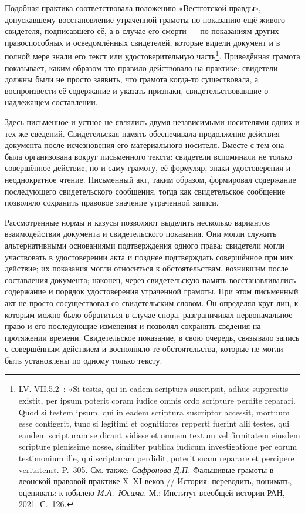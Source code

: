 Подобная практика соответствовала положению «Вестготской правды», допускавшему восстановление утраченной грамоты по показанию ещё живого свидетеля, подписавшего её, а в случае его смерти --- по показаниям других правоспособных и осведомлённых свидетелей, которые видели документ и в полной мере знали его текст или удостоверительную часть\footnote{LV. VII.5.2~: «Si testis, qui in eadem scriptura suscripsit, adhuc supprestis existit, per ipsum poterit coram iudice omnis ordo scripture perdite reparari. Quod si testem ipsum, qui in eadem scriptura suscriptor accessit, mortuum esse contigerit, tunc si legitimi et cognitiores repperti fuerint alii testes, qui eandem scripturam se dicant vidisse et omnem textum vel firmitatem eiusdem scripture plenissime nosse, similiter publica iudicum investigatione per eorum testimonium ille, qui scripturam perdidit, poterit suam reparare et percipere veritatem». P.~305. См. также: \emph{Сафронова Д.П.} Фальшивые грамоты в леонской правовой практике X--XI веков // История: переводить, понимать, оценивать: к юбилею \emph{М.А.~Юсима}. М.: Институт всеобщей истории РАН, 2021. С.~126.}. Приведённая грамота показывает, каким образом это правило действовало на практике: свидетели должны были не просто заявить, что грамота когда-то существовала, а воспроизвести её содержание и указать признаки, свидетельствовавшие о надлежащем составлении.

Здесь письменное и устное не являлись двумя независимыми носителями одних и тех же сведений. Свидетельская память обеспечивала продолжение действия документа после исчезновения его материального носителя. Вместе с тем она была организована вокруг письменного текста: свидетели вспоминали не только совершённое действие, но и саму грамоту, её формуляр, знаки удостоверения и неоднократное чтение. Письменный акт, таким образом, формировал содержание последующего свидетельского сообщения, тогда как свидетельское сообщение позволяло сохранить правовое значение утраченной записи.

Рассмотренные нормы и казусы позволяют выделить несколько вариантов взаимодействия документа и свидетельского показания. Они могли служить альтернативными основаниями подтверждения одного права; свидетели могли участвовать в удостоверении акта и позднее подтверждать совершённое при них действие; их показания могли относиться к обстоятельствам, возникшим после составления документа; наконец, через свидетельскую память восстанавливались содержание и порядок удостоверения утраченной грамоты. При этом письменный акт не просто сосуществовал со свидетельским словом. Он определял круг лиц, к которым можно было обратиться в случае спора, разграничивал первоначальное право и его последующие изменения и позволял сохранять сведения на протяжении времени. Свидетельское показание, в свою очередь, связывало запись с совершённым действием и восполняло те обстоятельства, которые не могли быть установлены по одному только тексту.

